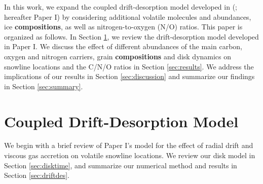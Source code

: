 \documentclass[apj]{emulateapj}
\newcommand{\emgr}[1]{\emph{ \color{gray} #1}}
\begin{document}


In this work, we expand the coupled drift-desorption model developed in (\citealt{piso15b}; hereafter Paper I) by considering additional volatile molecules and abundances, ice \textbf{compositions}, as well as nitrogen-to-oxygen (N/O) ratios. This paper is organized as follows. In Section \ref{sec:review}, we review the drift-desorption model developed in Paper I. We discuss the effect of different abundances of the main carbon, oxygen and nitrogen carriers, grain \textbf{compositions} and disk dynamics on snowline locations and the C/N/O ratios in Section \ref{sec:results}. We address the implications of our results in Section \ref{sec:discussion} and summarize our findings in Section \ref{sec:summary}.  




\section{Coupled Drift-Desorption Model}
\label{sec:review}

We begin with a brief review of Paper I's model for the effect of radial drift and viscous gas accretion on volatile snowline locations. We review our disk model in Section \ref{sec:disktime}, and summarize our numerical method and results in Section \ref{sec:driftdes}.
\end{document}
